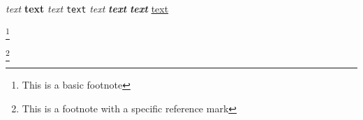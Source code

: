 \documentclass[12pt]{article}
\newcommand\"{quote}
\begin{document}

\inputminted{py}{path/to/file.py}



\emph{text}
\textbf{text}
\textit{text}
\texttt{text}
\textsl{text}
\textbf{\textit{text}}
\textit{\textbf{text}}
\underline{text}



\footnote{This is a basic footnote}

\footnote [ 5 ] {This is a footnote with a specific reference mark}


\footnotemark

\footnotemark  [ 1   ]
\end{document}
